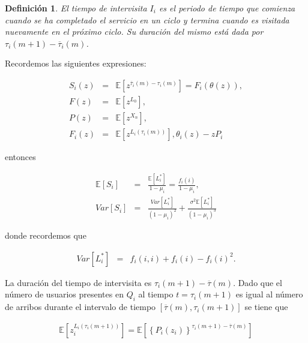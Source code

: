 \documentclass{article}
\newtheorem{Def}{Definición}
\newcommand{\esp}{\mathbb{E}}
\begin{document}
\begin{Def}
El tiempo de intervisita $I_{i}$ es el periodo de tiempo que comienza cuando se ha completado el servicio en un ciclo y termina cuando es visitada nuevamente en el pr\'oximo ciclo. Su  duraci\'on del mismo est\'a dada por $\tau_{i}\left(m+1\right)-\overline{\tau}_{i}\left(m\right)$.
\end{Def}


Recordemos las siguientes expresiones:

\begin{eqnarray*}
S_{i}\left(z\right)&=&\esp\left[z^{\overline{\tau}_{i}\left(m\right)-\tau_{i}\left(m\right)}\right]=F_{i}\left(\theta\left(z\right)\right),\\
F\left(z\right)&=&\esp\left[z^{L_{0}}\right],\\
P\left(z\right)&=&\esp\left[z^{X_{n}}\right],\\
F_{i}\left(z\right)&=&\esp\left[z^{L_{i}\left(\tau_{i}\left(m\right)\right)}\right],
\theta_{i}\left(z\right)-zP_{i}
\end{eqnarray*}

entonces 

\begin{eqnarray*}
\esp\left[S_{i}\right]&=&\frac{\esp\left[L_{i}^{*}\right]}{1-\mu_{i}}=\frac{f_{i}\left(i\right)}{1-\mu_{i}},\\
Var\left[S_{i}\right]&=&\frac{Var\left[L_{i}^{*}\right]}{\left(1-\mu_{i}\right)^{2}}+\frac{\sigma^{2}\esp\left[L_{i}^{*}\right]}{\left(1-\mu_{i}\right)^{3}}
\end{eqnarray*}

donde recordemos que

\begin{eqnarray*}
Var\left[L_{i}^{*}\right]&=&f_{i}\left(i,i\right)+f_{i}\left(i\right)-f_{i}\left(i\right)^{2}.
\end{eqnarray*}

La duraci\'on del tiempo de intervisita es $\tau_{i}\left(m+1\right)-\overline{\tau}\left(m\right)$. Dado que el n\'umero de usuarios presentes en $Q_{i}$ al tiempo $t=\tau_{i}\left(m+1\right)$ es igual al n\'umero de arribos durante el intervalo de tiempo $\left[\overline{\tau}\left(m\right),\tau_{i}\left(m+1\right)\right]$ se tiene que


\begin{eqnarray*}
\esp\left[z_{i}^{L_{i}\left(\tau_{i}\left(m+1\right)\right)}\right]=\esp\left[\left\{P_{i}\left(z_{i}\right)\right\}^{\tau_{i}\left(m+1\right)-\overline{\tau}\left(m\right)}\right]
\end{eqnarray*}
\end{document}

